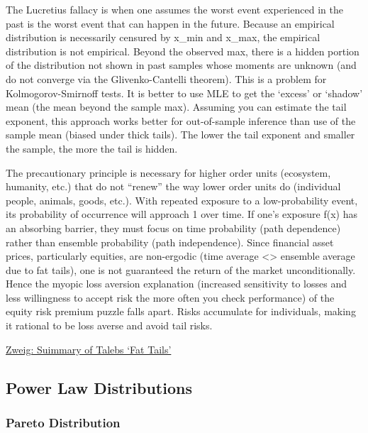 \documentclass[
]{book}
\begin{document}
The Lucretius fallacy is when one assumes the worst event experienced in the past is the worst event that can happen in the future. Because an empirical distribution is necessarily censured by x\_min and x\_max, the empirical distribution is not empirical. Beyond the observed max, there is a hidden portion of the distribution not shown in past samples whose moments are unknown (and do not converge via the Glivenko-Cantelli theorem). This is a problem for Kolmogorov-Smirnoff tests. It is better to use MLE to get the `excess' or `shadow' mean (the mean beyond the sample max). Assuming you can estimate the tail exponent, this approach works better for out-of-sample inference than use of the sample mean (biased under thick tails). The lower the tail exponent and smaller the sample, the more the tail is hidden.

The precautionary principle is necessary for higher order units (ecosystem, humanity, etc.) that do not ``renew'' the way lower order units do (individual people, animals, goods, etc.). With repeated exposure to a low-probability event, its probability of occurrence will approach 1 over time. If one's exposure f(x) has an absorbing barrier, they must focus on time probability (path dependence) rather than ensemble probability (path independence). Since financial asset prices, particularly equities, are non-ergodic (time average \textless\textgreater{} ensemble average due to fat tails), one is not guaranteed the return of the market unconditionally. Hence the myopic loss aversion explanation (increased sensitivity to losses and less willingness to accept risk the more often you check performance) of the equity risk premium puzzle falls apart. Risks accumulate for individuals, making it rational to be loss averse and avoid tail risks.

\href{https://www.amazon.com/review/RMD3OUG0WQWWY/ref=cm_cr_srp_d_rdp_perm?ie=UTF8\&ASIN=1544508050}{Zweig: Suimmary of Talebs `Fat Tails'}

\hypertarget{power-law-distributions}{%
\subsection{Power Law Distributions}\label{power-law-distributions}}

\hypertarget{pareto-distribution}{%
\subsubsection{Pareto Distribution}\label{pareto-distribution}}
\end{document}

